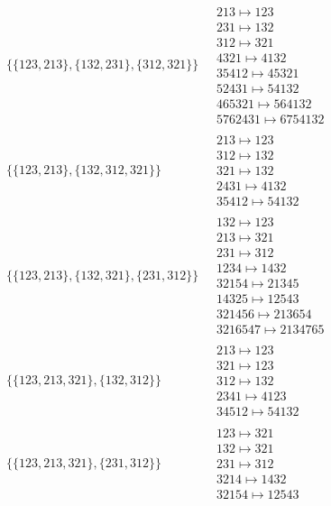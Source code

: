 \begin{scriptsize}
\begin{align}
\begin{matrix}
\end{matrix}
\\
\{\{123, 213\}, \{132, 231\}, \{312, 321\}\}
\ 
&
\begin{matrix}
213 \mapsto 123\\231 \mapsto 132\\312 \mapsto 321\\4321 \mapsto 4132\\35412 \mapsto 45321\\52431 \mapsto 54132\\465321 \mapsto 564132\\5762431 \mapsto 6754132
\end{matrix}
\\
\{\{123, 213\}, \{132, 312, 321\}\}
\ 
&
\begin{matrix}
213 \mapsto 123\\312 \mapsto 132\\321 \mapsto 132\\2431 \mapsto 4132\\35412 \mapsto 54132
\end{matrix}
\\
\{\{123, 213\}, \{132, 321\}, \{231, 312\}\}
\ 
&
\begin{matrix}
132 \mapsto 123\\213 \mapsto 321\\231 \mapsto 312\\1234 \mapsto 1432\\32154 \mapsto 21345\\14325 \mapsto 12543\\321456 \mapsto 213654\\3216547 \mapsto 2134765
\end{matrix}
\\
\{\{123, 213, 321\}, \{132, 312\}\}
\ 
&
\begin{matrix}
213 \mapsto 123\\321 \mapsto 123\\312 \mapsto 132\\2341 \mapsto 4123\\34512 \mapsto 54132
\end{matrix}
\\
\{\{123, 213, 321\}, \{231, 312\}\}
\ 
&
\begin{matrix}
123 \mapsto 321\\132 \mapsto 321\\231 \mapsto 312\\3214 \mapsto 1432\\32154 \mapsto 12543

\end{matrix}
\end{align}
\end{scriptsize}
